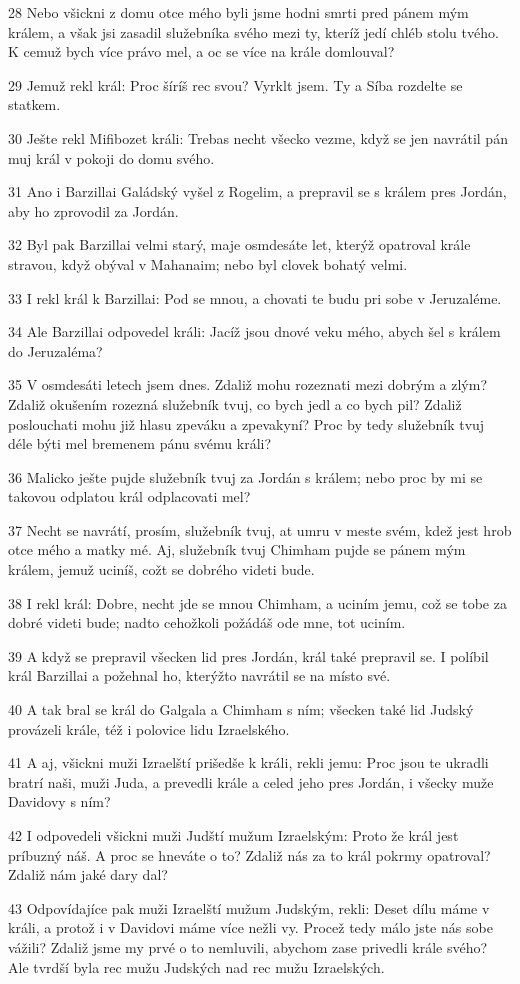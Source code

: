 \par 28 Nebo všickni z domu otce mého byli jsme hodni smrti pred pánem mým králem, a však jsi zasadil služebníka svého mezi ty, kteríž jedí chléb stolu tvého. K cemuž bych více právo mel, a oc se více na krále domlouval?
\par 29 Jemuž rekl král: Proc šíríš rec svou? Vyrklt jsem. Ty a Síba rozdelte se statkem.
\par 30 Ješte rekl Mifibozet králi: Trebas necht všecko vezme, když se jen navrátil pán muj král v pokoji do domu svého.
\par 31 Ano i Barzillai Galádský vyšel z Rogelim, a prepravil se s králem pres Jordán, aby ho zprovodil za Jordán.
\par 32 Byl pak Barzillai velmi starý, maje osmdesáte let, kterýž opatroval krále stravou, když obýval v Mahanaim; nebo byl clovek bohatý velmi.
\par 33 I rekl král k Barzillai: Pod se mnou, a chovati te budu pri sobe v Jeruzaléme.
\par 34 Ale Barzillai odpovedel králi: Jacíž jsou dnové veku mého, abych šel s králem do Jeruzaléma?
\par 35 V osmdesáti letech jsem dnes. Zdaliž mohu rozeznati mezi dobrým a zlým? Zdaliž okušením rozezná služebník tvuj, co bych jedl a co bych pil? Zdaliž poslouchati mohu již hlasu zpeváku a zpevakyní? Proc by tedy služebník tvuj déle býti mel bremenem pánu svému králi?
\par 36 Malicko ješte pujde služebník tvuj za Jordán s králem; nebo proc by mi se takovou odplatou král odplacovati mel?
\par 37 Necht se navrátí, prosím, služebník tvuj, at umru v meste svém, kdež jest hrob otce mého a matky mé. Aj, služebník tvuj Chimham pujde se pánem mým králem, jemuž uciníš, cožt se dobrého videti bude.
\par 38 I rekl král: Dobre, necht jde se mnou Chimham, a uciním jemu, což se tobe za dobré videti bude; nadto cehožkoli požádáš ode mne, tot uciním.
\par 39 A když se prepravil všecken lid pres Jordán, král také prepravil se. I políbil král Barzillai a požehnal ho, kterýžto navrátil se na místo své.
\par 40 A tak bral se král do Galgala a Chimham s ním; všecken také lid Judský provázeli krále, též i polovice lidu Izraelského.
\par 41 A aj, všickni muži Izraelští prišedše k králi, rekli jemu: Proc jsou te ukradli bratrí naši, muži Juda, a prevedli krále a celed jeho pres Jordán, i všecky muže Davidovy s ním?
\par 42 I odpovedeli všickni muži Judští mužum Izraelským: Proto že král jest príbuzný náš. A proc se hneváte o to? Zdaliž nás za to král pokrmy opatroval? Zdaliž nám jaké dary dal?
\par 43 Odpovídajíce pak muži Izraelští mužum Judským, rekli: Deset dílu máme v králi, a protož i v Davidovi máme více nežli vy. Procež tedy málo jste nás sobe vážili? Zdaliž jsme my prvé o to nemluvili, abychom zase privedli krále svého? Ale tvrdší byla rec mužu Judských nad rec mužu Izraelských.

